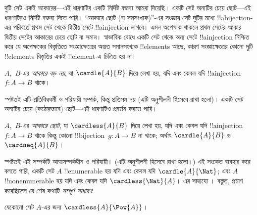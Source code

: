 \documentclass[../../../include/open-logic-section]{subfiles}
\begin{document}


\begin{explain}
দুটি সেট একই আকারের—এই ধারণাটির একটি নির্দিষ্ট বক্তব্য আমরা দিয়েছি। একটি সেট অন্যটির চেয়ে ছোট—এই ধারণাটিরও নির্দিষ্ট বক্তব্য দিতে পারি। ``আকারে ছোট (বা সমসংখ্যক)''-এর সংজ্ঞায় সেট দুটির মধ্যে !!a{bijection}-এর পরিবর্তে প্রথম সেট থেকে দ্বিতীয় সেটে !!a{injection} লাগবে। এমন অপেক্ষক থাকলে প্রথম সেটের আকার দ্বিতীয় সেটের আকারের চেয়ে ছোট বা সমান। স্বাভাবিক বোধে একটি সেট থেকে অন্য সেটে !!a{injection} নিশ্চিত করে যে অপেক্ষকের বিস্তৃতিতে সংজ্ঞাক্ষেত্রের অন্তত সমানসংখ্যক !!{element}s আছে, কারণ সংজ্ঞাক্ষেত্রের কোনো দুটি !!{element}s বিস্তৃতির একই !!{element}-এ চিত্রিত হয় না।
\end{explain}

\begin{defn}
$A$,~$B$-এর \emph{আকারে বড় নয়}, যা $\cardle{A}{B}$ দিয়ে লেখা হয়, যদি এবং কেবল যদি !!a{injection} $f \colon A \to B$ থাকে।
\end{defn}

স্পষ্টতই এটি প্রতিবিম্বধর্মী ও পরিযায়ী সম্পর্ক, কিন্তু প্রতিসম নয় (এটি অনুশীলনী হিসেবে রাখা হলো)। একটি সেট অন্যটির চেয়ে (কঠোরভাবে) ছোট—এই ধারণাটিও প্রবর্তন করতে পারি।

\begin{defn}
$A$,~$B$-এর \emph{আকারে ছোট}, যা $\cardless{A}{B}$ দিয়ে লেখা হয়, যদি এবং কেবল যদি !!a{injection}~$f\colon A \to B$ থাকে কিন্তু কোনো !!{bijection}~$g\colon A
\to B$ না থাকে; অর্থাৎ $\cardle{A}{B}$ ও $\cardneq{A}{B}$।
\end{defn}

স্পষ্টতই এই সম্পর্কটি আত্মসম্পর্কহীন ও পরিযায়ী। (এটি অনুশীলনী হিসেবে রাখা হলো।) এই সংকেত ব্যবহার করে বলতে পারি, একটি সেট $A$ !!{enumerable} হয় যদি এবং কেবল যদি $\cardle{A}{\Nat}$; এবং $A$ !!{nonenumerable} হয় যদি এবং কেবল যদি $\cardless{\Nat}{A}$। এর সাহায্যে
। বস্তুত, \citet{Cantor1892} প্রমাণ করেছিলেন যে শেষ কথাটি \emph{সম্পূর্ণ সাধারণ}:

\begin{thm}[কান্টর]
যেকোনো সেট $A$-এর জন্য $\cardless{A}{\Pow{A}}$।
\end{thm}
\end{document}
